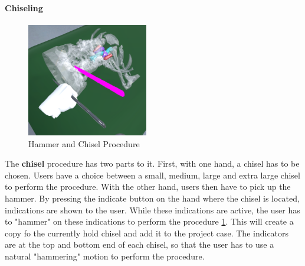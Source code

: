 \paragraph{Chiseling}

\begin{figure}[ht]
    \centering
    \includegraphics[width=200px]{images/implementation/features/procedures/chisel.png}
    \caption{\label{fig::FeatureChisel}Hammer and Chisel Procedure}
\end{figure}

The \textbf{chisel} procedure has two parts to it.
First, with one hand, a chisel has to be chosen.
Users have a choice between a small, medium, large and extra large chisel to perform the procedure.
With the other hand, users then have to pick up the hammer.
By pressing the indicate button on the hand where the chisel is located, indications are shown to the user.
While these indications are active, the user has to "hammer" on these indications to perform the procedure \ref{fig::FeatureChisel}.
This will create a copy fo the currently hold chisel and add it to the project case.
The indicators are at the top and bottom end of each chisel, so that the user has to use a natural "hammering" motion to perform the procedure.